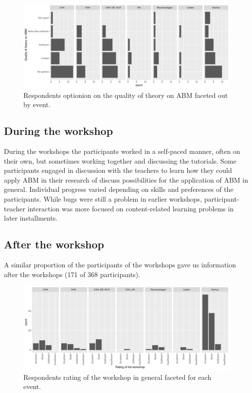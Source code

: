 \documentclass[
]{article}
\begin{document}
\begin{figure}
\centering
\includegraphics{paper_files/figure-latex/available-theory-1.pdf}
\caption{\label{fig:available-theory}Respondents optionion on the quality of theory on ABM faceted out by event.}
\end{figure}

\hypertarget{during-the-workshop}{%
\subsection{During the workshop}\label{during-the-workshop}}

During the workshops the participants worked in a self-paced manner, often on their own, but sometimes working together and discussing the tutorials. Some participants engaged in discussion with the teachers to learn how they could apply ABM in their research of discuss possibilities for the application of ABM in general. Individual progress varied depending on skills and preferences of the participants. While bugs were still a problem in earlier workshops, participant-teacher interaction was more focused on content-related learning problems in later installments.

\hypertarget{after-the-workshop}{%
\subsection{After the workshop}\label{after-the-workshop}}

A similar proportion of the participants of the workshops gave us information after the workshops (171 of 368 participants).

\begin{figure}
\centering
\includegraphics{paper_files/figure-latex/rating-workshop-1.pdf}
\caption{\label{fig:rating-workshop}Respondents rating of the workshop in general faceted for each event.}
\end{figure}
\end{document}
